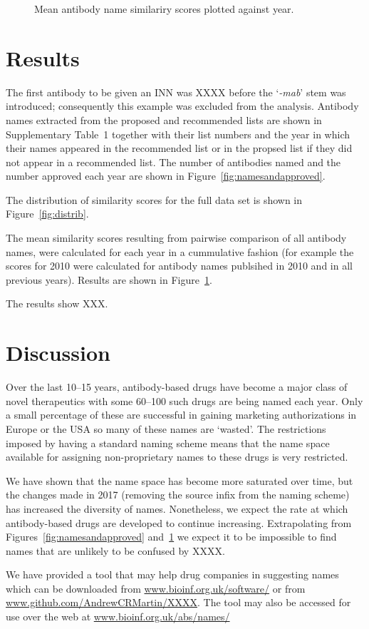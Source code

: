 \documentclass{article}
\newcommand{\eg}[1]{`\emph{#1}'}
\begin{document}
\begin{figure}
  \caption{\label{fig:results} Mean antibody name similariry
    scores plotted against year.}
\end{figure}



\section{Results}
The first antibody to be given an INN was XXXX before the \eg{-mab}
stem was introduced; consequently this example was excluded from the
analysis. Antibody names extracted from the proposed and recommended
lists are shown in Supplementary Table~1 together with their list
numbers and the year in which their names appeared in the recommended
list or in the propsed list if they did not appear in a recommended
list. The number of antibodies named and the number approved each year
are shown in Figure~\ref{fig:namesandapproved}.

The distribution of similarity scores for the full data set is shown in
Figure~\ref{fig:distrib}. 

The mean similarity scores resulting from pairwise comparison of all
antibody names, were calculated for each year in a cummulative fashion
(for example the scores for 2010 were calculated for antibody names
publsihed in 2010 and in all previous years). Results are shown in
Figure~\ref{fig:results}. 

The results show XXX.

\section{Discussion}
Over the last 10--15 years, antibody-based drugs have become a major
class of novel therapeutics with some 60--100 such drugs are being
named each year. Only a small percentage of these are successful in
gaining marketing authorizations in Europe or the USA so many of these
names are `wasted'. The restrictions imposed by having a standard
naming scheme means that the name space available for assigning
non-proprietary names to these drugs is very restricted.

We have shown that the name space has become more saturated over time,
but the changes made in 2017 (removing the source infix from the
naming scheme) has increased the diversity of names. Nonetheless, we
expect the rate at which antibody-based drugs are developed to
continue increasing. Extrapolating from
Figures~\ref{fig:namesandapproved} and~\ref{fig:results} we expect it
to be impossible to find names that are unlikely to be confused by
XXXX.

We have provided a tool that may help drug companies in suggesting
names which can be downloaded from \url{www.bioinf.org.uk/software/}
or from \url{www.github.com/AndrewCRMartin/XXXX}. The tool may also be
accessed for use over the web at \url{www.bioinf.org.uk/abs/names/}



\end{document}
